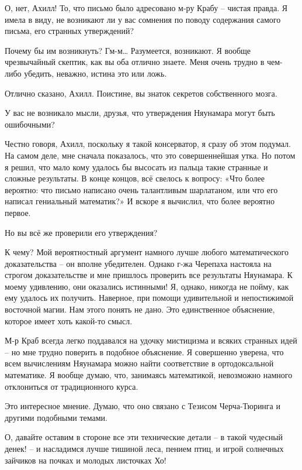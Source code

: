 \documentclass[../main.tex]{subfiles}
\begin{document}
\begin{dialogue}
 О, нет, Ахилл! То, что письмо было адресовано м-ру Крабу \--- чистая правда. Я имела в виду, не возникают ли у вас сомнения по поводу содержания самого письма, его странных утверждений?

 Почему бы им возникнуть? Гм-м\ldots{} Разумеется, возникают. Я вообще чрезвычайный скептик, как вы оба отлично знаете. Меня очень трудно в чем-либо убедить, неважно, истина это или ложь.

 Отлично сказано, Ахилл. Поистине, вы знаток секретов собственного мозга.

 У вас не возникало мысли, друзья, что утверждения Няунамара могут быть ошибочными?

 Честно говоря, Ахилл, поскольку я такой консерватор, я сразу об этом подумал. На самом деле, мне сначала показалось, что это совершеннейшая утка. Но потом я решил, что мало кому удалось бы высосать из пальца такие странные и сложные результаты. В конце концов, всё свелось к вопросу: «Что более вероятно: что письмо написано очень талантливым шарлатаном, или что его написал гениальный математик?» И вскоре я вычислил, что более вероятно первое.

 Но вы всё же проверили его утверждения?

 К чему? Мой вероятностный аргумент намного лучше любого математического доказательства \--- он вполне убедителен. Однако г-жа Черепаха настояла на строгом доказательстве и мне пришлось проверить все результаты Няунамара. К моему удивлению, они оказались истинными! Я, однако, никогда не пойму, как ему удалось их получить. Наверное, при помощи удивительной и непостижимой восточной магии. Нам этого понять не дано. Это единственное объяснение, которое имеет хоть какой-то смысл.

 М-р Краб всегда легко поддавался на удочку мистицизма и всяких странных идей \--- но мне трудно поверить в подобное объяснение. Я совершенно уверена, что всем вычислениям Няунамара можно найти соответствие в ортодоксальной математике. Я вообще думаю, что, занимаясь математикой, невозможно намного отклониться от традиционного курса.

 Это интересное мнение. Думаю, что оно связано с Тезисом Черча-Тюринга и другими подобными темами.

 О, давайте оставим в стороне все эти технические детали \--- в такой чудесный денек! \--- и насладимся лучше тишиной леса, пением птиц, и игрой солнечных зайчиков на почках и молодых листочках Хо!


\end{dialogue}
\end{document}
